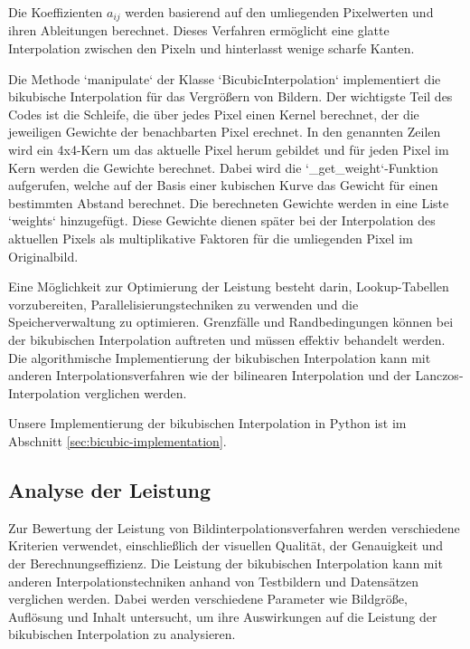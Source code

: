 Die Koeffizienten $a_{ij}$ werden basierend auf den umliegenden Pixelwerten und ihren Ableitungen berechnet.
Dieses Verfahren ermöglicht eine glatte Interpolation zwischen den Pixeln und hinterlasst wenige scharfe Kanten.

Die Methode `manipulate` der Klasse `BicubicInterpolation` implementiert die bikubische Interpolation für das Vergrößern von Bildern.
Der wichtigste Teil des Codes ist die Schleife, die über jedes Pixel einen Kernel berechnet, der die jeweiligen Gewichte der benachbarten Pixel erechnet.
In den genannten Zeilen wird ein 4x4-Kern um das aktuelle Pixel herum gebildet und für jeden Pixel im Kern werden die Gewichte berechnet.
Dabei wird die `\_get\_weight`-Funktion aufgerufen, welche auf der Basis einer kubischen Kurve das Gewicht für einen bestimmten Abstand berechnet.
Die berechneten Gewichte werden in eine Liste `weights` hinzugefügt.
Diese Gewichte dienen später bei der Interpolation des aktuellen Pixels als multiplikative Faktoren für die umliegenden Pixel im Originalbild.

Eine Möglichkeit zur Optimierung der Leistung besteht darin, Lookup-Tabellen vorzubereiten, Parallelisierungstechniken zu verwenden und die Speicherverwaltung zu optimieren.
Grenzfälle und Randbedingungen können bei der bikubischen Interpolation auftreten und müssen effektiv behandelt werden.
Die algorithmische Implementierung der bikubischen Interpolation kann mit anderen Interpolationsverfahren wie der bilinearen Interpolation und der Lanczos-Interpolation verglichen werden.

Unsere Implementierung der bikubischen Interpolation in Python ist im Abschnitt \ref{sec:bicubic-implementation}.

\subsection{Analyse der Leistung}

    Zur Bewertung der Leistung von Bildinterpolationsverfahren werden verschiedene Kriterien verwendet, einschließlich der visuellen Qualität, der Genauigkeit und der Berechnungseffizienz. 
    Die Leistung der bikubischen Interpolation kann mit anderen Interpolationstechniken anhand von Testbildern und Datensätzen verglichen werden. 
    Dabei werden verschiedene Parameter wie Bildgröße, Auflösung und Inhalt untersucht, um ihre Auswirkungen auf die Leistung der bikubischen Interpolation zu analysieren.

